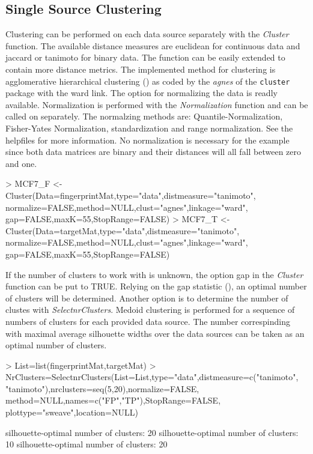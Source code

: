 \documentclass[a4paper]{article}
\begin{document}
\subsection{Single Source Clustering}
Clustering can be performed on each data source separately with the {\it
Cluster} function. The available distance measures are euclidean for continuous
data and jaccard or tanimoto for binary data. The function can be easily
extended to contain more distance metrics. The implemented method for
clustering is agglomerative hierarchical clustering (\cite{Hastie2009}) as coded
by the {\it agnes} of the \texttt{cluster} package with the ward link. The
option for normalizing the data is readly available. Normalization is performed
with the {\it Normalization} function and can be called on separately. The
normalzing methods are: Quantile-Normalization, Fisher-Yates Normalization,
standardization and range normalization. See the helpfiles for more
information. No normalization is necessary for the example since both data
matrices are binary and their distances will all fall between zero and one.
\begin{Schunk}
\begin{Sinput}
> MCF7_F <- Cluster(Data=fingerprintMat,type="data",distmeasure="tanimoto", 
                   normalize=FALSE,method=NULL,clust="agnes",linkage="ward",
                   gap=FALSE,maxK=55,StopRange=FALSE) 
> MCF7_T <- Cluster(Data=targetMat,type="data",distmeasure="tanimoto",
                   normalize=FALSE,method=NULL,clust="agnes",linkage="ward",
                   gap=FALSE,maxK=55,StopRange=FALSE)
\end{Sinput}
\end{Schunk}
\noindent If the number of clusters to work with is unknown, the option gap in
the {\it Cluster} function can be put to TRUE. Relying on the gap statistic
(\cite{Hastie2009}), an optimal number of clusters will be determined. Another
option is to determine the number of clustes with {\it SelectnrClusters}.
Medoid clustering is performed for a sequence of numbers of clusters for each
provided data source. The number correspinding with maximal average silhouette
widths over the data sources can be taken as an optimal number of clusters.
\begin{Schunk}
\begin{Sinput}
> List=list(fingerprintMat,targetMat)
> NrClusters=SelectnrClusters(List=List,type="data",distmeasure=c("tanimoto",
                             "tanimoto"),nrclusters=seq(5,20),normalize=FALSE,
                              method=NULL,names=c("FP","TP"),StopRange=FALSE,
                              plottype="sweave",location=NULL)
\end{Sinput}
\begin{Soutput}
silhouette-optimal number of clusters: 20 
silhouette-optimal number of clusters: 10 
silhouette-optimal number of clusters: 20 
\end{Soutput}
\end{Schunk}
\end{document}
